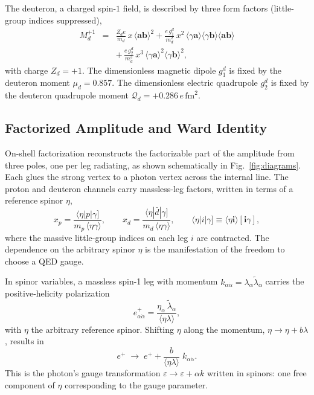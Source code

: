 \documentclass[
  aps,prd,twocolumn,nofootinbib,superscriptaddress,
  longbibliography,floatfix,preprintnumbers
]{revtex4-2}
\newcommand{\ad}[2]{\langle #1 #2\rangle}
\newcommand{\sq}[2]{[#1 #2]}
\begin{document}
The deuteron, a
charged spin-$1$ field, is described by three form factors (little-group indices
suppressed),
\begin{eqnarray}
  M^{+1}_{d} &=& \frac{Z_{d}e}{m_{d}}\,x\,\ad{\bm{a}}{\bm{b}}^{2}
         + \frac{e\,g_{1}^{d}}{m_{d}^{2}}\,x^{2}\,\ad{\gamma}{\bm{a}}\ad{\gamma}{\bm{b}}\ad{\bm{a}}{\bm{b}}
         \nonumber\\
         && +\, \frac{e\,g_{2}^{d}}{m_{d}^{3}}\,x^{3}\,\ad{\gamma}{\bm{a}}^{2}\ad{\gamma}{\bm{b}}^{2},
  \label{eq:photond}
\end{eqnarray}
with charge $Z_{d}=+1$. The dimensionless magnetic dipole $g_{1}^{d}$ is fixed
by the deuteron moment $\mu_{d}=0.857$. The dimensionless electric quadrupole
$g_{2}^{d}$ is fixed by the deuteron quadrupole moment
$\mathcal{Q}_{d}=+0.286\,e\,\mathrm{fm}^{2}$.

\subsection{Factorized Amplitude and Ward Identity}
\label{sec:fact}

On-shell factorization reconstructs the factorizable part of the amplitude from three poles, one per leg
radiating, as shown schematically in Fig.~\ref{fig:diagrams}. Each glues the
strong vertex to a photon vertex across the internal line. The proton and
deuteron channels carry massless-leg factors, written in terms of a reference spinor $\eta$,
\begin{equation}
  x_p=\frac{\langle\eta|p|\gamma]}{m_p\,\ad{\eta}{\gamma}},\qquad
  x_d=\frac{\langle\eta|\bar d|\gamma]}{m_d\,\ad{\eta}{\gamma}},
  \qquad \langle\eta|i|\gamma]\equiv\ad{\eta}{\bm i}\sq{\bm i}{\gamma},
  \label{eq:xfact}
\end{equation}
where the massive little-group indices on each leg $i$ are contracted. The dependence on the arbitrary spinor
$\eta$ is the manifestation of the freedom to choose a QED gauge.

In spinor variables, a massless spin-1 leg with momentum $k_{\alpha\dot\alpha}=\lambda_{\alpha}\tilde\lambda_{\dot\alpha}$ carries the
positive-helicity polarization
\begin{equation}
  e^{+}_{\alpha\dot\alpha}
  = \frac{\eta_{\alpha}\,\tilde\lambda_{\dot\alpha}}{\ad{\eta}{\lambda}},
  \label{eq:polref}
\end{equation}
with $\eta$ the arbitrary reference spinor.  Shifting $\eta$ along the momentum, $\eta\to\eta+b\lambda$, results in
\begin{equation}
  e^{+}\;\longrightarrow\;e^{+}
  +\frac{b}{\ad{\eta}{\lambda}}\;k_{\alpha\dot\alpha}.
  \label{eq:gaugeshift}
\end{equation}
This is the photon's gauge transformation $\varepsilon\to\varepsilon+\alpha k$ written in
spinors: one free component of $\eta$ corresponding to the gauge parameter. 
\end{document}
